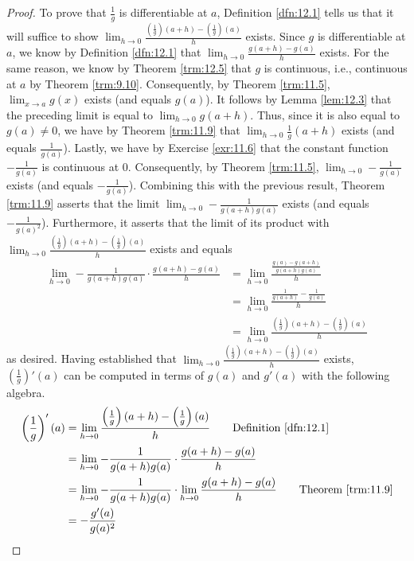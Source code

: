 \documentclass[../main.tex]{subfiles}
\begin{document}
\begin{exercise}
\begin{enumerate}[label={(\alph*)}]
\begin{proof}
            To prove that $\frac{1}{g}$ is differentiable at $a$, Definition \ref{dfn:12.1} tells us that it will suffice to show $\lim_{h\to 0}\frac{(\frac{1}{g})(a+h)-(\frac{1}{g})(a)}{h}$ exists. Since $g$ is differentiable at $a$, we know by Definition \ref{dfn:12.1} that $\lim_{h\to 0}\frac{g(a+h)-g(a)}{h}$ exists. For the same reason, we know by Theorem \ref{trm:12.5} that $g$ is continuous, i.e., continuous at $a$ by Theorem \ref{trm:9.10}. Consequently, by Theorem \ref{trm:11.5}, $\lim_{x\to a}g(x)$ exists (and equals $g(a)$). It follows by Lemma \ref{lem:12.3} that the preceding limit is equal to $\lim_{h\to 0}g(a+h)$. Thus, since it is also equal to $g(a)\neq 0$, we have by Theorem \ref{trm:11.9} that $\lim_{h\to 0}\frac{1}{g}(a+h)$ exists (and equals $\frac{1}{g(a)}$). Lastly, we have by Exercise \ref{exr:11.6} that the constant function $-\frac{1}{g(a)}$ is continuous at 0. Consequently, by Theorem \ref{trm:11.5}, $\lim_{h\to 0}-\frac{1}{g(a)}$ exists (and equals $-\frac{1}{g(a)}$). Combining this with the previous result, Theorem \ref{trm:11.9} asserts that the limit $\lim_{h\to 0}-\frac{1}{g(a+h)g(a)}$ exists (and equals $-\frac{1}{g(a)^2}$). Furthermore, it asserts that the limit of its product with $\lim_{h\to 0}\frac{(\frac{1}{g})(a+h)-(\frac{1}{g})(a)}{h}$ exists and equals
            \begin{align*}
                \lim_{h\to 0}-\frac{1}{g(a+h)g(a)}\cdot\frac{g(a+h)-g(a)}{h} &= \lim_{h\to 0}\frac{\frac{g(a)-g(a+h)}{g(a+h)g(a)}}{h}\\
                &= \lim_{h\to 0}\frac{\frac{1}{g(a+h)}-\frac{1}{g(a)}}{h}\\
                &= \lim_{h\to 0}\frac{(\frac{1}{g})(a+h)-(\frac{1}{g})(a)}{h}
            \end{align*}
            as desired. Having established that $\lim_{h\to 0}\frac{(\frac{1}{g})(a+h)-(\frac{1}{g})(a)}{h}$ exists, $(\frac{1}{g})'(a)$ can be computed in terms of $g(a)$ and $g'(a)$ with the following algebra.
            \begin{align*}
                \left( \frac{1}{g} \right)'(a) &= \lim_{h\to 0}\frac{\left( \frac{1}{g} \right)(a+h)-\left( \frac{1}{g} \right)(a)}{h}\tag*{Definition \ref{dfn:12.1}}\\
                &= \lim_{h\to 0}-\frac{1}{g(a+h)g(a)}\cdot\frac{g(a+h)-g(a)}{h}\\
                &= \lim_{h\to 0}-\frac{1}{g(a+h)g(a)}\cdot\lim_{h\to 0}\frac{g(a+h)-g(a)}{h}\tag*{Theorem \ref{trm:11.9}}\\
                &= -\frac{g'(a)}{g(a)^2}

\end{align*}
\end{proof}
\end{enumerate}
\end{exercise}
\end{document}
